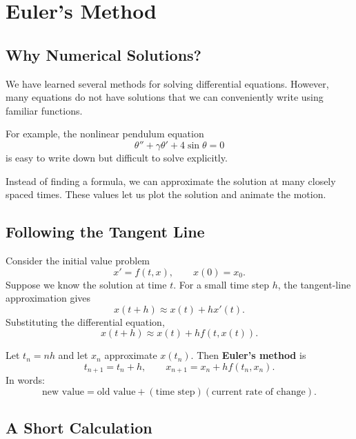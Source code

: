 \documentclass[10pt,letterpaper]{article}
\begin{document}

\section{Euler's Method}

\subsection{Why Numerical Solutions?}

We have learned several methods for solving differential
equations. However, many equations do not have solutions
that we can conveniently write using familiar functions.

For example, the nonlinear pendulum equation
\[
\theta''+\gamma\theta'+4\sin\theta=0
\]
is easy to write down but difficult to solve explicitly.

Instead of finding a formula, we can approximate
the solution at many closely spaced times.
These values let us plot the solution and animate
the motion.

\subsection{Following the Tangent Line}

Consider the initial value problem
\[
x'=f(t,x),\qquad x(0)=x_0.
\]
Suppose we know the solution at time $t$.
For a small time step $h$, the tangent-line approximation
gives
\[
x(t+h)\approx x(t)+hx'(t).
\]
Substituting the differential equation,
\[
x(t+h)\approx x(t)+hf(t,x(t)).
\]

Let $t_n=nh$ and let $x_n$ approximate $x(t_n)$.
Then \textbf{Euler's method} is
\[
\boxed{
t_{n+1}=t_n+h,
\qquad
x_{n+1}=x_n+hf(t_n,x_n).
}
\]
In words:
\[
\text{new value}
=
\text{old value}
+
(\text{time step})(\text{current rate of change}).
\]

\subsection{A Short Calculation}
\end{document}
